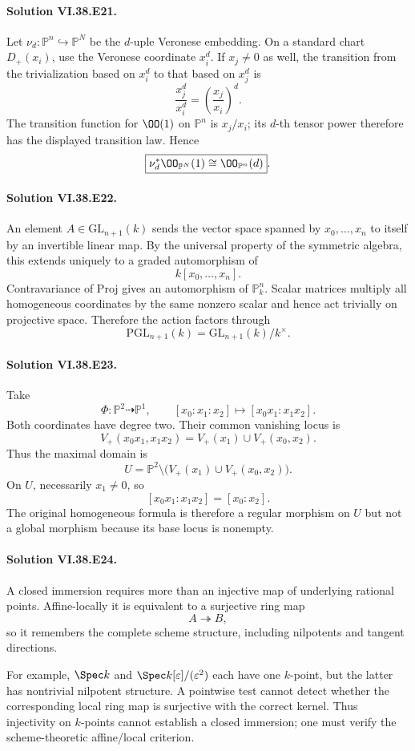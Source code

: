 \paragraph{Solution VI.38.E21.}
Let \(\nu_d:\mathbb P^n\hookrightarrow\mathbb P^N\) be the \(d\)-uple Veronese
embedding.  On a standard chart \(D_+(x_i)\), use the Veronese coordinate
\(x_i^d\).  If \(x_j\neq0\) as well, the transition from the trivialization based
on \(x_i^d\) to that based on \(x_j^d\) is
\[
\frac{x_j^d}{x_i^d}=\left(\frac{x_j}{x_i}\right)^d.
\]
The transition function for \(\OO(1)\) on \(\mathbb P^n\) is \(x_j/x_i\); its
\(d\)-th tensor power therefore has the displayed transition law. Hence
\[
\boxed{\nu_d^*\OO_{\mathbb P^N}(1)\cong\OO_{\mathbb P^n}(d)}.
\]

\paragraph{Solution VI.38.E22.}
An element \(A\in\mathrm{GL}_{n+1}(k)\) sends the vector space spanned by
\(x_0,\ldots,x_n\) to itself by an invertible linear map. By the universal property
of the symmetric algebra, this extends uniquely to a graded automorphism of
\[
k[x_0,\ldots,x_n].
\]
Contravariance of Proj gives an automorphism of \(\mathbb P^n_k\). Scalar matrices
multiply all homogeneous coordinates by the same nonzero scalar and hence act
trivially on projective space. Therefore the action factors through
\[
\boxed{\mathrm{PGL}_{n+1}(k)=\mathrm{GL}_{n+1}(k)/k^\times}.
\]

\paragraph{Solution VI.38.E23.}
Take
\[
\Phi:\mathbb P^2\dashrightarrow\mathbb P^1,
\qquad
[x_0:x_1:x_2]\longmapsto[x_0x_1:x_1x_2].
\]
Both coordinates have degree two. Their common vanishing locus is
\[
V_+(x_0x_1,x_1x_2)
=V_+(x_1)\cup V_+(x_0,x_2).
\]
Thus the maximal domain is
\[
U=\mathbb P^2\setminus\bigl(V_+(x_1)\cup V_+(x_0,x_2)\bigr).
\]
On \(U\), necessarily \(x_1\neq0\), so
\[
[x_0x_1:x_1x_2]=[x_0:x_2].
\]
The original homogeneous formula is therefore a regular morphism on \(U\) but not
a global morphism because its base locus is nonempty.

\paragraph{Solution VI.38.E24.}
A closed immersion requires more than an injective map of underlying rational
points.  Affine-locally it is equivalent to a surjective ring map
\[
A\twoheadrightarrow B,
\]
so it remembers the complete scheme structure, including nilpotents and tangent
directions.

For example, \(\Spec k\) and \(\Spec k[\varepsilon]/(\varepsilon^2)\) each have one
\(k\)-point, but the latter has nontrivial nilpotent structure. A pointwise test
cannot detect whether the corresponding local ring map is surjective with the
correct kernel. Thus injectivity on \(k\)-points cannot establish a closed
immersion; one must verify the scheme-theoretic affine/local criterion.
